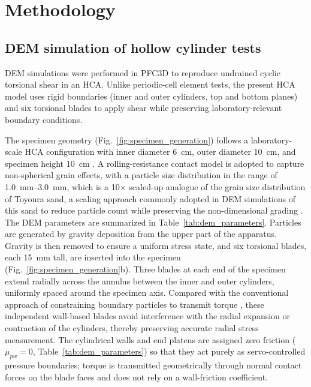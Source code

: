 \section{Methodology}
\label{sec:methodology}

\subsection{DEM simulation of hollow cylinder tests}
\label{subsec:dem_hca}

DEM simulations were performed in \textsc{PFC3D} \citep{Itasca2021} to reproduce undrained cyclic torsional shear in an HCA. Unlike periodic-cell element tests, the present HCA model uses rigid boundaries (inner and outer cylinders, top and bottom planes) and six torsional blades to apply shear while preserving laboratory-relevant boundary conditions.

The specimen geometry (Fig.~\ref{fig:specimen_generation}) follows a laboratory-scale HCA configuration with inner diameter \SI{6}{cm}, outer diameter \SI{10}{cm}, and specimen height \SI{10}{cm} \citep{Vargas2020}. A rolling-resistance contact model \citep{IwashitaOda1998,WensrichKatterfeld2012} is adopted to capture non-spherical grain effects, with a particle size distribution in the range of \SIrange{1.0}{3.0}{mm}, which is a 10$\times$ scaled-up analogue of the grain size distribution of Toyoura sand, a scaling approach commonly adopted in DEM simulations of this sand to reduce particle count while preserving the non-dimensional grading \citep{Song2024}. The DEM parameters are summarized in Table~\ref{tab:dem_parameters}. Particles are generated by gravity deposition from the upper part of the apparatus. Gravity is then removed to ensure a uniform stress state, and six torsional blades, each 15~mm tall, are inserted into the specimen (Fig.~\ref{fig:specimen_generation}b). Three blades at each end of the specimen extend radially across the annulus between the inner and outer cylinders, uniformly spaced around the specimen axis. Compared with the conventional approach of constraining boundary particles to transmit torque \citep[e.g.,][]{LiZhangGutierrez2015,Liu2021}, these independent wall-based blades avoid interference with the radial expansion or contraction of the cylinders, thereby preserving accurate radial stress measurement. The cylindrical walls and end platens are assigned zero friction ($\mu_{pw}=0$, Table~\ref{tab:dem_parameters}) so that they act purely as servo-controlled pressure boundaries; torque is transmitted geometrically through normal contact forces on the blade faces and does not rely on a wall-friction coefficient.

